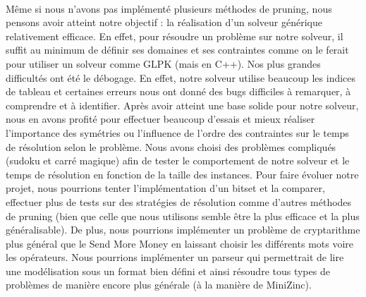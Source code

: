\documentclass[11pt]{article}
\begin{document}
\paragraph{}
Même si nous n'avons pas implémenté plusieurs méthodes de pruning, nous pensons avoir atteint notre objectif : la réalisation d'un solveur générique relativement efficace. En effet, pour résoudre un problème sur notre solveur, il suffit au minimum de définir ses domaines et ses contraintes comme on le ferait pour utiliser un solveur comme GLPK (mais en C++). Nos plus grandes difficultés ont été le débogage. En effet, notre solveur utilise beaucoup les indices de tableau et certaines erreurs nous ont donné des bugs difficiles à remarquer, à comprendre et à identifier. Après avoir atteint une base solide pour notre solveur, nous en avons profité pour effectuer beaucoup d'essais et mieux réaliser l'importance des symétries ou l'influence de l'ordre des contraintes sur le temps de résolution selon le problème. Nous avons choisi des problèmes compliqués (sudoku et carré magique) afin de tester le comportement de notre solveur et le temps de résolution en fonction de la taille des instances. Pour faire évoluer notre projet, nous pourrions tenter l'implémentation d'un bitset et la comparer, effectuer plus de tests sur des stratégies de résolution comme d'autres méthodes de pruning (bien que celle que nous utilisons semble être la plus efficace et la plus généralisable). De plus, nous pourrions implémenter un problème de cryptarithme plus général que le Send More Money en laissant choisir les différents mots voire les opérateurs. Nous pourrions implémenter un parseur qui permettrait de lire une modélisation sous un format bien défini et ainsi résoudre tous types de problèmes de manière encore plus générale (à la manière de MiniZinc).
\end{document}
